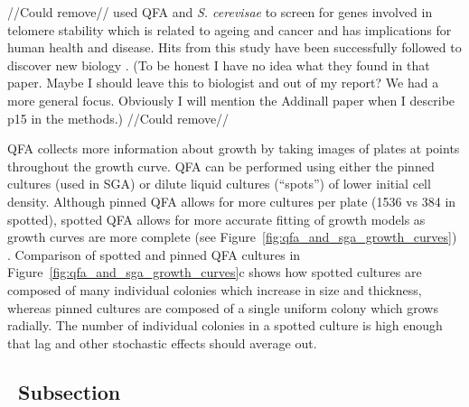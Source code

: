 //Could remove//
\citet{Addinall2011} used QFA and \textit{S. cerevisae} to screen for
genes involved in telomere stability which is related to ageing and
cancer and has implications for human health and disease. Hits from
this study have been successfully followed to discover new biology
\citep{Holstein20141259}. (To be honest I have no idea what they found
in that paper. Maybe I should leave this to biologist and out of my
report? We had a more general focus. Obviously I will mention the
Addinall paper when I describe p15 in the methods.)
//Could remove//






QFA
collects more information about growth by taking images of plates at
points throughout the growth curve. QFA can be performed using either
the pinned cultures (used in SGA) or dilute liquid cultures
(``spots'') of lower initial cell density. Although pinned QFA allows
for more cultures per plate (1536 vs 384 in spotted), spotted QFA
allows for more accurate fitting of growth models as growth curves are
more complete (see Figure~\ref{fig:qfa_and_sga_growth_curves})
\citep{Lawless2010}. Comparison of spotted and pinned QFA cultures in
Figure~\ref{fig:qfa_and_sga_growth_curves}c shows how spotted cultures
are composed of many individual colonies which increase in size and
thickness, whereas pinned cultures are composed of a single uniform
colony which grows radially. The number of individual colonies in a
spotted culture is high enough that lag and other stochastic effects
should average out.






\subsection{\thesubsection~Subsection}

